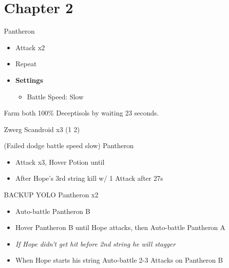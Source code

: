 \chapter{Chapter 2}

	\begin{battle}[0:10]{Pantheron}
		\begin{itemize}
			\item Attack x2
			\item Repeat
		\end{itemize}
	\end{battle}

	\begin{menu}
		\begin{itemize}
			\item \textbf{Settings}
			      \begin{itemize}
				      \item Battle Speed: Slow
			      \end{itemize}
		\end{itemize}
	\end{menu}

	Farm both 100\% Deceptisols by waiting 23 seconds.
	\begin{battle}[0:23]{Zwerg Scandroid x3 (1 2)}
	\end{battle}

	\begin{battle}[0:27]{(Failed dodge battle speed slow) Pantheron}
		\begin{itemize}
			\item Attack x3, Hover Potion until
			\item After Hope's 3rd string kill w/ 1 Attack after 27s
		\end{itemize}
	\end{battle}
	
	\begin{battle}[0:24]{BACKUP YOLO Pantheron x2}
		\begin{itemize}
			\item Auto-battle Pantheron B
			\item Hover Pantheron B until Hope attacks, then Auto-battle Pantheron A
			\item \textit{If Hope didn't get hit before 2nd string he will stagger}
			\item When Hope starts his string Auto-battle 2-3 Attacks on Pantheron B
		\end{itemize}
	\end{battle}

